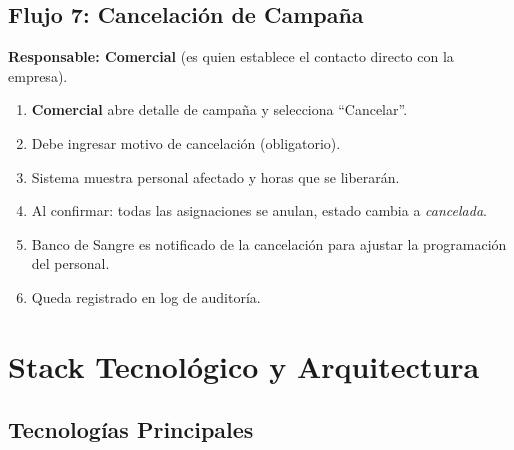 \documentclass[10pt,a4paper]{article}
\begin{document}
\subsection{Flujo 7: Cancelaci\'{o}n de Campaña}

\textbf{Responsable: Comercial} (es quien establece el contacto directo con la empresa).

\begin{enumerate}[leftmargin=2em]
    \item \textbf{Comercial} abre detalle de campaña y selecciona ``Cancelar''.
    \item Debe ingresar motivo de cancelaci\'{o}n (obligatorio).
    \item Sistema muestra personal afectado y horas que se liberar\'{a}n.
    \item Al confirmar: todas las asignaciones se anulan, estado cambia a \textit{cancelada}.
    \item Banco de Sangre es notificado de la cancelaci\'{o}n para ajustar la programaci\'{o}n del personal.
    \item Queda registrado en log de auditor\'{i}a.
\end{enumerate}


\section{Stack Tecnol\'{o}gico y Arquitectura}

\subsection{Tecnolog\'{i}as Principales}
\end{document}
